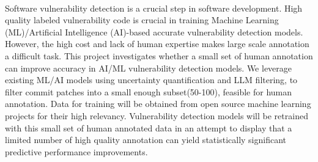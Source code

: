 \done{}
 \\

\done{}
Software vulnerability detection is a crucial step in software development. High quality labeled vulnerability code is crucial in training Machine Learning (ML)/Artificial Intelligence (AI)-based accurate vulnerability detection models. However, the high cost and lack of human expertise makes large scale annotation a difficult task. This project investigates whether a small set of human annotation can improve accuracy in AI/ML vulnerability detection models. We leverage existing ML/AI models using uncertainty quantification and LLM filtering, to filter commit patches into a small enough subset(50-100), feasible for human annotation. Data for training will be obtained from open source machine learning projects for their high relevancy. Vulnerability detection models will be retrained with this small set of human annotated data in an attempt to display that a limited number of high quality annotation can yield statistically significant predictive performance improvements.